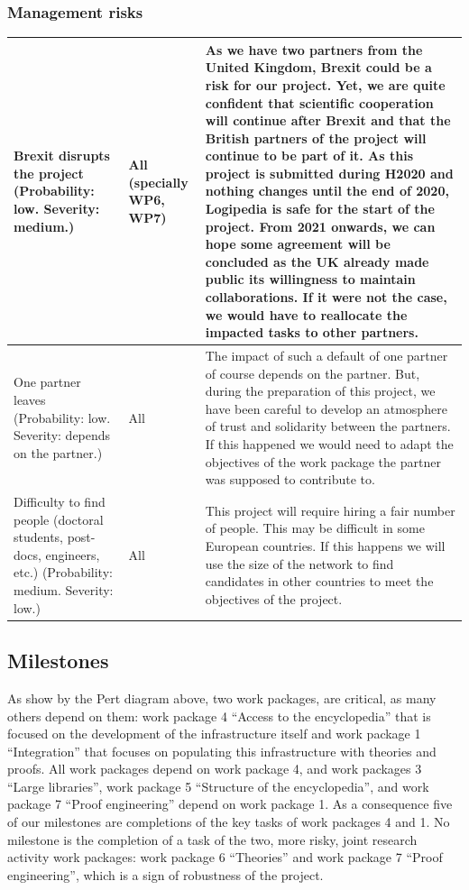 \subsubsection*{Management risks}

\begin{longtable}{|p{}|p{}|p{}|}
\hline
Brexit disrupts the project (Probability: low. Severity: medium.)
&
All (specially WP6, WP7)
&
As we have two partners from the United Kingdom, Brexit could be a risk
for our project. Yet, we are quite confident
that scientific
cooperation will continue after Brexit and that the British partners
of the project will continue to be part of it.
As this project is submitted during H2020 and nothing changes until
the end of 2020, Logipedia is safe for the start of the project. From
2021 onwards, we can hope some agreement will be concluded as the UK
already made public its willingness to maintain collaborations.
If it were not the
case, we would have to reallocate the impacted tasks to other partners. 
\\
\hline
One partner leaves (Probability: low. Severity: depends on the partner.)
&
All
&
The impact of such a default of one partner of course depends on the
partner. But, during the preparation of this project, we have been
careful to develop an atmosphere of trust and solidarity between the
partners. If this happened
we would need to adapt the objectives of the work package the partner
was supposed to contribute to.
\\
\hline
Difficulty to find people (doctoral students, post-docs, engineers, etc.)
(Probability: medium. Severity: low.)
&
All
&
This project will require hiring a fair number of people. This may be
difficult in some European countries. If this happens we will use the
size of the network to find candidates in other countries to meet
the objectives of the project.\\
\hline
\end{longtable}

\subsection*{Milestones}\label{sec:milestones}

As show by the Pert diagram above, two work packages, are critical, as
many others depend on them: work package 4 ``Access to the
encyclopedia'' that is focused on the development of the
infrastructure itself and work package 1 ``Integration'' that focuses
on populating this infrastructure with theories and proofs. All work
packages depend on work package 4, and work packages 3 ``Large
libraries'', work package 5 ``Structure of the encyclopedia'', and
work package 7 ``Proof engineering'' depend on work package 1.  As a
consequence five of our milestones are completions of the key tasks of
work packages 4 and 1.  No milestone is the completion of a task of
the two, more risky, joint research activity work packages: work
package 6 ``Theories'' and work package 7 ``Proof engineering'', which
is a sign of robustness of the project.
  


